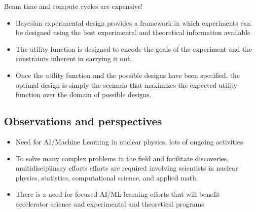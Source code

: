\documentclass[%
oneside,                 %
final,                   %
10pt]{article}
\begin{document}
Beam time and compute cycles are expensive!

\begin{itemize}
\item Bayesian experimental design provides a framework in which experiments can be designed using the best experimental and theoretical information available 

\item The utility function is designed to encode the goals of the experiment and the constraints inherent in carrying it out. 

\item Once the utility function and the possible designs have been specified, the optimal design is simply the scenario that  maximizes the expected utility function over the domain of possible designs.
\end{itemize}

\noindent
\subsection{Observations and perspectives}
\begin{block}{}
\begin{itemize}
\item Need for AI/Machine Learning in nuclear physics, lots of ongoing activities

\item To solve many complex problems in the field and facilitate discoveries, multidisciplinary efforts efforts are required involving scientists in  nuclear physics, statistics, computational science, and applied math.

\item There is a need for  focused AI/ML learning efforts that will benefit accelerator science and experimental and theoretical programs
\end{itemize}

\noindent
\end{block}

\end{document}
